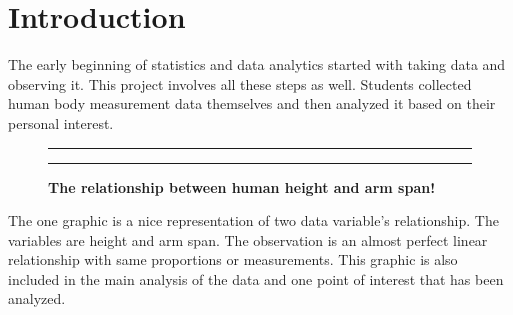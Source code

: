\documentclass[]{article}
\begin{document}

\noindent  

\section{Introduction}
\label{sec:intro}

The early beginning of statistics and data analytics started with taking
data and observing it. This project involves all these steps as well.
Students collected human body measurement data themselves and then
analyzed it based on their personal interest.

\begin{figure}[!ht]
    \hrule
    \caption{ \textbf{The relationship between human height and arm span!} }
    \begin{center}
    \end{center}
    \label{fig:OneGraphic}
    \hrule
\end{figure}

\newline
\newline

The one graphic is a nice representation of two data variable's
relationship. The variables are height and arm span. The observation is
an almost perfect linear relationship with same proportions or
measurements. This graphic is also included in the main analysis of the
data and one point of interest that has been analyzed.
\end{document}

